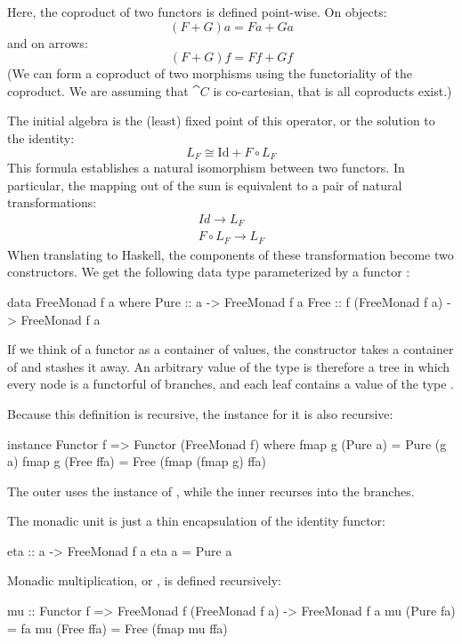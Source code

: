 \documentclass[DaoFP]{subfiles}
\begin{document}
Here, the coproduct of two functors is defined point-wise. On objects:
\[ (F + G) a = F a + G a \]
and on arrows:
\[ (F + G) f = F f + G f \]
(We can form a coproduct of two morphisms using the functoriality of the coproduct. We are assuming that $\cat C$ is co-cartesian, that is all coproducts exist.)

The initial algebra is the (least) fixed point of this operator, or the solution to the identity:
\[ L_F \cong \text{Id} + F \circ L_F \]
This formula establishes a natural isomorphism between two functors. In particular, the mapping out of the sum is equivalent to a pair of natural transformations:
\begin{align*}
Id \to L_F
\\
F \circ L_F \to L_F
\end{align*}
When translating to Haskell, the components of these transformation become two constructors. We get the following data type parameterized by a functor :
\begin{haskell}
data FreeMonad f a where
   Pure :: a -> FreeMonad f a
   Free :: f (FreeMonad f a) -> FreeMonad f a
\end{haskell}

If we think of a functor  as a container of values, the constructor  takes a container of  and stashes it away. An arbitrary value of the type  is therefore a tree in which every node is a functorful of branches, and each leaf contains a value of the type .

Because this definition is recursive, the  instance for it is also recursive:
\begin{haskell}
instance Functor f => Functor (FreeMonad f) where
  fmap g (Pure a) = Pure (g a)
  fmap g (Free ffa) = Free (fmap (fmap g) ffa)
\end{haskell}
The outer  uses the  instance of , while the inner  recurses into the branches.

The monadic unit is just a thin encapsulation of the identity functor:
\begin{haskell}
eta :: a -> FreeMonad f a
eta a = Pure a
\end{haskell}

Monadic multiplication, or , is defined recursively:
\begin{haskell}
mu :: Functor f => FreeMonad f (FreeMonad f a) -> FreeMonad f a
mu (Pure fa) = fa
mu (Free ffa) = Free (fmap mu ffa)
\end{haskell}
\end{document}
